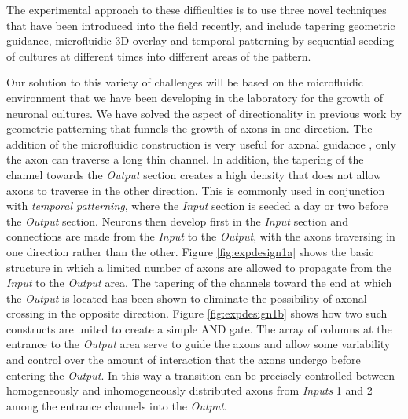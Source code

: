 The experimental approach to these difficulties is to use three novel techniques that have been introduced into the field recently, and include tapering geometric guidance, microfluidic 3D overlay and temporal patterning by sequential seeding of cultures at different times into different areas of the pattern.

Our solution to this variety of challenges will be based on the microfluidic environment that we have been developing in the laboratory for the growth of neuronal cultures. We have solved the aspect of directionality in previous work \cite{Feinerman2008} by geometric patterning that funnels the growth of axons in one direction. The addition of the microfluidic construction is very useful for axonal guidance \cite{Peyrin2011,Park2006,Taylor2005}, only the axon can traverse a long thin channel. In addition, the tapering of the channel towards the {\it Output} section creates a high density that does not allow axons to traverse in the other direction. This is commonly used in conjunction with {\it temporal patterning}, where the {\it Input} section is seeded a day or two before the {\it Output} section. Neurons then develop first in the {\it Input} section and connections are made from the {\it Input} to the {\it Output}, with the axons traversing in one direction rather than the other.
Figure \ref{fig:expdesign1a} shows the basic structure in which a limited number of axons are allowed to propagate from the {\it Input} to the {\it Output} area. The tapering of the channels toward the end at which the {\it Output} is located has been shown \cite{Peyrin2011} to eliminate the possibility of axonal crossing in the opposite direction. Figure \ref{fig:expdesign1b} shows how two such constructs are united to create a simple AND gate. The array of columns at the entrance to the {\it Output} area serve to guide the axons and allow some variability and control over the amount of interaction that the axons undergo before entering the {\it Output}. In this way a transition can be precisely controlled between homogeneously and inhomogeneously distributed axons from {\it Inputs} 1 and 2 among the entrance channels into the {\it Output}.

